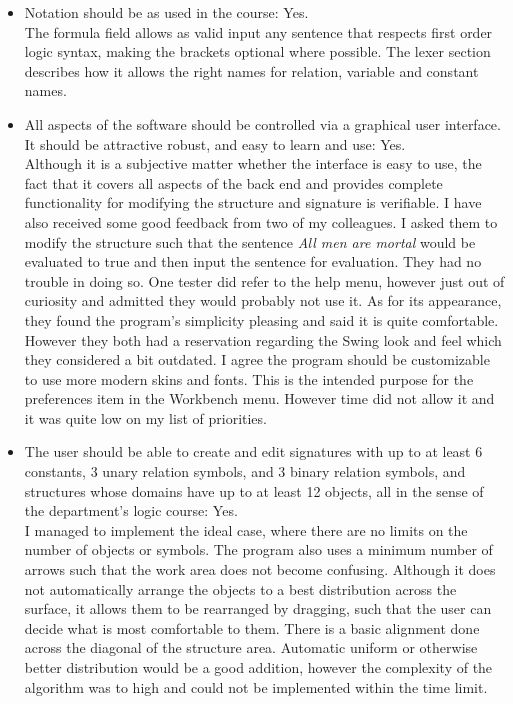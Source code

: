 \documentclass{report}
\begin{document}
\begin{itemize}
\item Notation should be as used in the course: Yes.\\
The formula field allows as valid input any sentence that respects first order 
logic syntax, making the brackets optional where possible. The lexer section 
describes how it allows the right names for relation, variable and constant 
names.

\item All aspects of the software should be controlled via a graphical user 
interface. It should be attractive robust, and easy to learn and use: Yes.\\
Although it is a subjective matter whether the interface is easy to use, the 
fact that it covers all aspects of the back end and provides complete 
functionality for modifying the structure and signature is verifiable. I have 
also received some good feedback from two of my colleagues. I asked them to 
modify the structure such that the sentence \emph{All men are mortal} would be 
evaluated to true and then input the sentence for evaluation. They had no 
trouble in doing so. One tester did refer to the help menu, however just out of 
curiosity and admitted they would probably not use it. As for its appearance, 
they found the program's simplicity pleasing and said it is quite comfortable. 
However they both had a reservation regarding the Swing look and feel which they 
considered a bit outdated. I agree the program should be customizable to use 
more modern skins and fonts. This is the intended purpose for the preferences 
item in the Workbench menu. However time did not allow it and it was quite low 
on my list of priorities.

\item The user should be able to create and edit signatures with up to at least 
6 constants, 3 unary relation symbols, and 3 binary relation symbols, and 
structures whose domains have up to at least 12 objects, all in the sense of 
the department's logic course: Yes.\\
I managed to implement the ideal case, where there are no limits on the number 
of objects or symbols. The program also uses a minimum number of arrows such 
that the work area does not become confusing. Although it does not automatically 
arrange the objects to a best distribution across the surface, it allows them to 
be rearranged by dragging, such that the user can decide what is most 
comfortable to them. There is a basic alignment done across the diagonal of the 
structure area. Automatic uniform or otherwise better distribution would be a 
good addition, however the complexity of the algorithm was to high and could not 
be implemented within the time limit.


\end{itemize}
\end{document}
